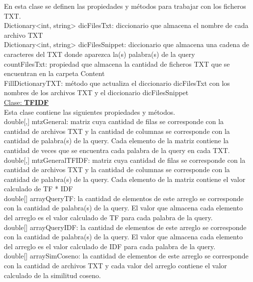 \documentclass[10pt,a4paper]{article}
\begin{document}
En esta clase se definen las propiedades y métodos para trabajar con los ficheros TXT.\\
 
Dictionary<int, string> dicFilesTxt: diccionario que almacena el nombre de cada archivo TXT\\

Dictionary<int, string> dicFilesSnippet: diccionario que almacena una cadena de caracteres del 
TXT donde aparezca la(s) palabra(s) de la query\\

countFilesTxt: propiedad que almacena la cantidad de ficheros TXT que se encuentran en la 
carpeta Content\\

FillDictionaryTXT: método que actualiza el diccionario dicFilesTxt con los nombres de los 
archivos TXT y el diccionario dicFilesSnippet\\

\underline{Clase: \textbf{TFIDF}}\\

Esta clase contiene las siguientes propiedades y métodos.\\

double[,] mtzGeneral: matriz cuya cantidad de filas se corresponde con la cantidad de archivos 
TXT y la cantidad de columnas se corresponde con la cantidad de palabra(s) de la query. Cada 
elemento de la matriz contiene la cantidad de veces que se encuentra cada palabra de la query
en cada TXT.\\

double[,] mtzGeneralTFIDF: matriz cuya cantidad de filas se corresponde con la cantidad de 
archivos TXT y la cantidad de columnas se corresponde con la cantidad de palabra(s) de la query. 
Cada elemento de la matriz contiene el valor calculado de TF * IDF\\

double[] arrayQueryTF: la cantidad de elementos de este arreglo se corresponde con la cantidad 
de palabra(s) de la query. El valor que almacena cada elemento del arreglo es el valor calculado 
de TF para cada palabra de la query.\\

double[] arrayQueryIDF: la cantidad de elementos de este arreglo se corresponde con la 
cantidad de palabra(s) de la query. El valor que almacena cada elemento del arreglo es el valor 
calculado de IDF para cada palabra de la query.\\

double[] arraySimCoseno: la cantidad de elementos de este arreglo se corresponde con la 
cantidad de archivos TXT y cada valor del arreglo contiene el valor calculado de la similitud 
coseno.\\
\end{document}
